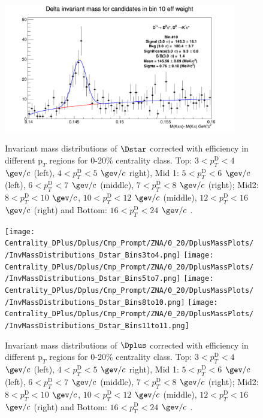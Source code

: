 \begin{figure}[!htp]
{\includegraphics[width=0.6\linewidth, height=5.6cm]{figuresVsCent/Dstar/MassPlots/020/InvMassDistributions_Dstar_Bins10to10.png}}

\caption{Invariant mass distributions of $\Dstar$ corrected with efficiency in different $\text{p}_T$ regions for 0-20$\%$ centrality class. Top: $3< p_{T}^{\text{D}}< 4$ $\gev/c$ (left), $4< p_{T}^{\text{D}}< 5$ $\gev/c$ right), Mid 1: $5< p_{T}^{\text{D}}< 6$ $\gev/c$ (left), $6 < p_{T}^{\text{D}} < 7$ $\gev/c$ (middle), $7< p_{T}^{\text{D}}< 8$ $\gev/c$ (right); Mid2: $8< p_{T}^{\text{D}}< 10$ $\gev/c$, $10< p_{T}^{\text{D}}< 12$ $\gev/c$  (middle), $12 < p_{T}^{\text{D}}< 16$ $\gev/c$  (right) and Bottom: $16<p_{T}^{\text{D}}< 24$ $\gev/c$ .}
\label{fig:InvMassDs020}
\end{figure}



\begin{figure}[!htp]
\centering
{\texttt{[image: Centrality\_DPlus/Dplus/Cmp\_Prompt/ZNA/0\_20/DplusMassPlots/
/InvMassDistributions\_Dstar\_Bins3to4.png]}}
{\texttt{[image: Centrality\_DPlus/Dplus/Cmp\_Prompt/ZNA/0\_20/DplusMassPlots/
/InvMassDistributions\_Dstar\_Bins5to7.png]}}
{\texttt{[image: Centrality\_DPlus/Dplus/Cmp\_Prompt/ZNA/0\_20/DplusMassPlots/
/InvMassDistributions\_Dstar\_Bins8to10.png]}}
{\texttt{[image: Centrality\_DPlus/Dplus/Cmp\_Prompt/ZNA/0\_20/DplusMassPlots/
/InvMassDistributions\_Dstar\_Bins11to11.png]}}

\caption{Invariant mass distributions of $\Dplus$ corrected with efficiency in different $\text{p}_T$ regions for 0-20$\%$ centrality class. Top: $3< p_{T}^{\text{D}}< 4$ $\gev/c$ (left), $4< p_{T}^{\text{D}}< 5$ $\gev/c$ right), Mid 1: $5< p_{T}^{\text{D}}< 6$ $\gev/c$ (left), $6 < p_{T}^{\text{D}} < 7$ $\gev/c$ (middle), $7< p_{T}^{\text{D}}< 8$ $\gev/c$ (right); Mid2: $8< p_{T}^{\text{D}}< 10$ $\gev/c$, $10< p_{T}^{\text{D}}< 12$ $\gev/c$  (middle), $12 < p_{T}^{\text{D}}< 16$ $\gev/c$  (right) and Bottom: $16<p_{T}^{\text{D}}< 24$ $\gev/c$ .}
\label{fig:InvMassDplus020}
\end{figure}

